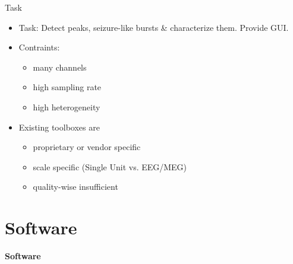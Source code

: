 \documentclass[10pt]{beamer}
\begin{document}
\begin{frame}{Task}
\begin{itemize}
 \item Task: Detect peaks, seizure-like bursts \& characterize them. Provide GUI. \\ [2em]
 \item Contraints: \begin{itemize}
                    \item many channels \\ [1em]
                    \item high sampling rate \\ [1em]
                    \item high heterogeneity \\ [2em]
                   \end{itemize}
  \item Existing toolboxes are
  \begin{itemize}
   \item proprietary or vendor specific
   \item scale specific (Single Unit vs. EEG/MEG)
   \item quality-wise insufficient
  \end{itemize}
\end{itemize}
\end{frame}

\section{Software}
\begin{frame}
\begin{center}
 \begin{Huge}
  \textbf{Software}
 \end{Huge}
 \end{center}
\end{frame}
\end{document}
